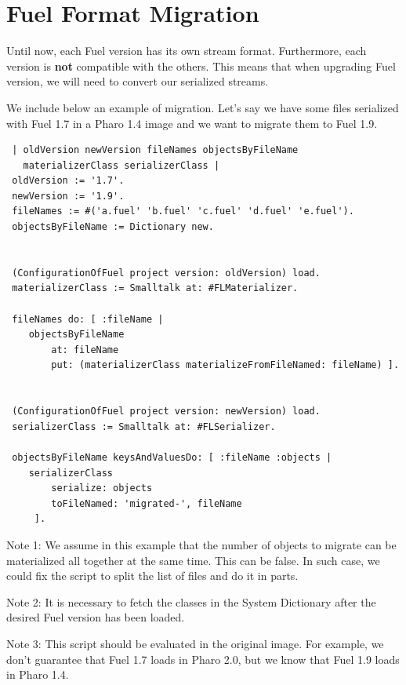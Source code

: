 \documentclass[a4paper,10pt,twoside]{book}
\begin{document}

\section{Fuel Format Migration}

Until now, each Fuel version has its own stream format. Furthermore, each version is \textbf{not} compatible with the others. This means that when upgrading Fuel version, we will need to convert our serialized streams. 

We include below an example of migration. Let's say we have some files serialized with Fuel 1.7 in a Pharo 1.4 image and we want to migrate them to Fuel 1.9.

\begin{lstlisting}
 | oldVersion newVersion fileNames objectsByFileName 
   materializerClass serializerClass |
 oldVersion := '1.7'.
 newVersion := '1.9'.
 fileNames := #('a.fuel' 'b.fuel' 'c.fuel' 'd.fuel' 'e.fuel').
 objectsByFileName := Dictionary new.
 

 (ConfigurationOfFuel project version: oldVersion) load.
 materializerClass := Smalltalk at: #FLMaterializer.
 
 fileNames do: [ :fileName | 
 	objectsByFileName 
 		at: fileName 
 		put: (materializerClass materializeFromFileNamed: fileName) ].
 
 
 (ConfigurationOfFuel project version: newVersion) load.
 serializerClass := Smalltalk at: #FLSerializer.
 
 objectsByFileName keysAndValuesDo: [ :fileName :objects |
 	serializerClass 
 		serialize: objects  
 		toFileNamed: 'migrated-', fileName
 	 ].
\end{lstlisting}

\begin{note}
Note 1: We assume in this example that the number of objects to migrate can be materialized all together at the same time. This can be false. In such case, we could fix the script to split the list of files and do it in parts.
\end{note}

\begin{note}
Note 2: It is necessary to fetch the classes in the System Dictionary after the desired Fuel version has been loaded.
\end{note}

\begin{note}
Note 3: This script should be evaluated in the original image. For example, we don't guarantee that Fuel 1.7 loads in Pharo 2.0, but we know that Fuel 1.9 loads in Pharo 1.4.
\end{note}
\end{document}
